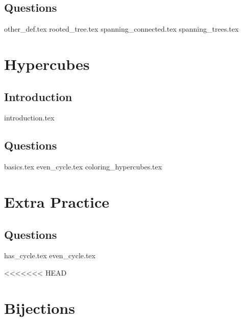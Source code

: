 \documentclass{exam}
\begin{document}
\subsection{Questions}
\begin{questions}
{other_def.tex}
{rooted_tree.tex}
{spanning_connected.tex}
{spanning_trees.tex}
\end{questions}

\section{Hypercubes}
\subsection{Introduction}
{introduction.tex}
\subsection{Questions}
\begin{questions}
{basics.tex}
{even_cycle.tex}
{coloring_hypercubes.tex}
\end{questions}

\section{Extra Practice}
\subsection{Questions}
\begin{questions}
{has_cycle.tex}
{even_cycle.tex}
\end{questions}

<<<<<<< HEAD
\section{Bijections}
\end{document}
